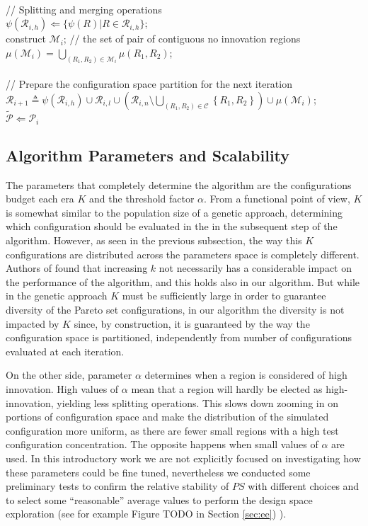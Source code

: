 \begin{algorithm}[t]
{			\nl \\ // Splitting and merging operations\\
			\nl $\psi(\mathscr{R}_{i,h}) \Leftarrow \lbrace 
					\psi(R) | R\in \mathscr{R}_{i,h}	
				\rbrace$; \\
			\nl construct $\mathscr{M}_i$; // the set of pair of contiguous no innovation regions \\
			\nl $\mu(\mathscr{M}_i) = \bigcup_{(R_1,R_2)\in\mathscr{M}_i} \mu(R_1,R_2)$;\\
			\nl\\ // Prepare the configuration space partition for the next iteration \\
			\nl $\mathcal{R}_{i+1} \triangleq
	\psi\left(\mathscr{R}_{i,h}\right) \cup \mathcal{R}_{i,l}\cup
	\left(\mathcal{R}_{i,n}\setminus\bigcup_{\left(R_{1},R_{2}\right)\in\mathcal{C}}\left\{ R_{1},R_{2}\right\} \right)\cup \mu(\mathscr{M}_i)$;\\
		}
	\nl $\tilde{\mathscr{P}} \Leftarrow \mathscr{P}_i$
\end{algorithm}
%

\subsection{Algorithm Parameters and Scalability} The parameters that
completely determine the algorithm are the configurations budget each
era $K$ and the threshold factor $\alpha$. From a functional point of
view, $K$ is somewhat similar to the population size of a genetic
approach, determining which configuration should be evaluated in the
in the subsequent step of the algorithm. However, as seen in the
previous subsection, the way this $K$ configurations are distributed
across the parameters space is completely different.
Authors of \cite{zitzler_ec00} found that
increasing $k$ not necessarily has a considerable impact on the
performance of the algorithm, and this holds also in our algorithm.
But while in the genetic approach $K$ must be sufficiently large
in order to guarantee diversity of the Pareto set configurations, in
our algorithm the diversity is not impacted by $K$ since, by
construction, it is guaranteed by the way the configuration space is
partitioned, independently from number of configurations evaluated at
each iteration. 

On the other side, parameter $\alpha$ determines when a region is considered of high
innovation. High values of $\alpha$ mean that a region will hardly be
elected as high-innovation, yielding less splitting operations. This
slows down zooming in on portions of configuration space and make the
distribution of the simulated configuration more uniform, as there are
fewer small regions with a high test configuration concentration. The
opposite happens when small values of $\alpha$ are used. In this
introductory work we are not explicitly focused on investigating how
these parameters could be fine tuned, nevertheless
we conducted some preliminary tests to confirm the relative stability
of $PS$ with different choices and to select some ``reasonable'' average
values to perform the design space exploration (see for example Figure
TODO in Section \ref{sec:ee})
). 

